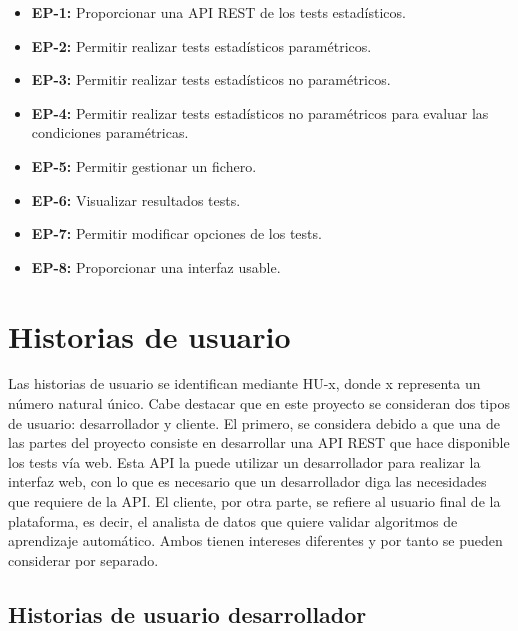 \begin{itemize}
\item \textbf{EP-1:} Proporcionar una API REST de los tests estadísticos.
\item \textbf{EP-2:} Permitir realizar tests estadísticos paramétricos.
\item \textbf{EP-3:} Permitir realizar tests estadísticos no paramétricos.
\item \textbf{EP-4:} Permitir realizar tests estadísticos no paramétricos para evaluar las condiciones paramétricas.
\item \textbf{EP-5:} Permitir gestionar un fichero.
\item \textbf{EP-6:} Visualizar resultados tests.
\item \textbf{EP-7:} Permitir modificar opciones de los tests.
\item \textbf{EP-8:} Proporcionar una interfaz usable.
\end{itemize}


\section{Historias de usuario}
Las historias de usuario se identifican mediante HU-x, donde x representa un número natural único. Cabe destacar que en este proyecto se consideran dos tipos de usuario: desarrollador y cliente. El primero, se considera debido a que una de las partes del proyecto consiste en desarrollar una API REST que hace disponible los tests vía web. Esta API la puede utilizar un desarrollador para realizar la interfaz web, con lo que es necesario que un desarrollador diga las necesidades que requiere de la API. El cliente, por otra parte, se refiere al usuario final de la plataforma, es decir, el analista de datos que quiere validar algoritmos de aprendizaje automático. Ambos tienen intereses diferentes y por tanto se pueden considerar por separado.


\subsection{Historias de usuario desarrollador}


